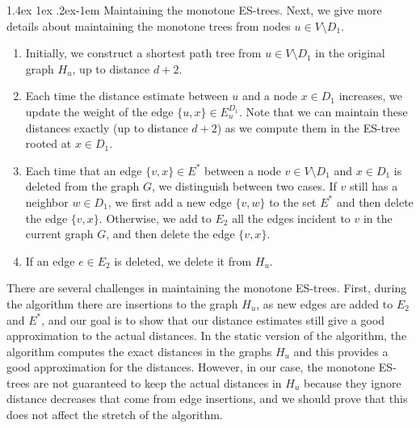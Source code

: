 \documentclass[11pt]{article}
\makeatletter
\theoremstyle{definition}
\theoremstyle{remark}
\newcommand{\ytodo}[1]{\todo[color=blue!20]{Y: #1}}
\newcommand{\sebastian}[1]{\todo[color=green!20]{S: #1}}
\renewcommand{\paragraph}{%
  \@startsection{paragraph}{4}%
  {\z@}{1.4ex \@plus 1ex \@minus .2ex}{-1em}%
  {\normalfont\normalsize\bfseries}%
}
\makeatother
\begin{document}
\begin{titlepage}
\paragraph{Maintaining the monotone ES-trees.}
Next, we give more details about maintaining the monotone trees from nodes $u \in V \setminus D_1$.
\begin{enumerate}
    \item Initially, we construct a shortest path tree from $u \in V \setminus D_1$ in the original graph $H_u$, up to distance $d+2$.
    \item Each time the distance estimate between $u$ and a node $x \in D_1$ increases, we update the weight of the edge $\{u,x\} \in E^{D_1}_u$. Note that we can maintain these distances exactly (up to distance $d+2$) as we compute them in the ES-tree rooted at $x \in D_1$.\label{step_dom}
    \item Each time that an edge $\{v,x\} \in E^*$ between a node $v \in V \setminus D_1$ and $x \in D_1$ is deleted from the graph $G$, we distinguish between two cases. If $v$ still has a neighbor $w \in D_1$, we first add a new edge $\{v,w\}$ to the set $E^*$ and then delete the edge $\{v,x\}$.%
    Otherwise, we add to $E_2$ all the edges incident to $v$ in the current graph $G$, and then delete the edge $\{v,x\}$.\label{step_E*_ES-tree}
    \item If an edge $e \in E_2$ is deleted, we delete it from $H_u$.
\end{enumerate}

There are several challenges in maintaining the monotone ES-trees. First, during the algorithm there are insertions to the graph $H_u$, as new edges are added to $E_2$ and $E^*$, and our goal is to show that our distance estimates still give a good approximation to the actual distances. In the static version of the algorithm, the algorithm computes the exact distances in the graphs $H_u$ and this provides a good approximation for the distances. However, in our case, the monotone ES-trees are not guaranteed to keep the actual distances in $H_u$ because they ignore distance decreases that come from edge insertions, and we should prove that this does not affect the stretch of the algorithm. 


\end{titlepage}
\end{document}
